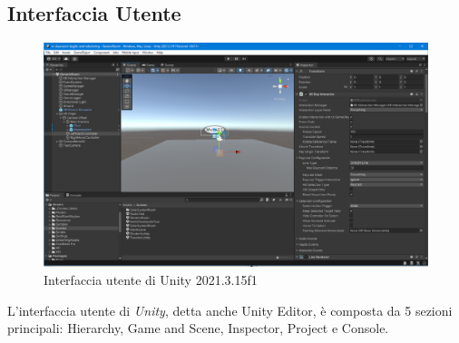 \subsection{Interfaccia Utente}
\begin{figure}[H]
    \centering
    \includegraphics[scale = 0.35]{Immagini/UnityInteface.jpg}
    \caption{Interfaccia utente di Unity 2021.3.15f1}
    \label{fig:my_label}
\end{figure}
L'interfaccia utente\cite{unityMain} di \textit{Unity}, detta anche Unity Editor, è composta da 5 sezioni principali: Hierarchy, Game and Scene, Inspector, Project e Console.

